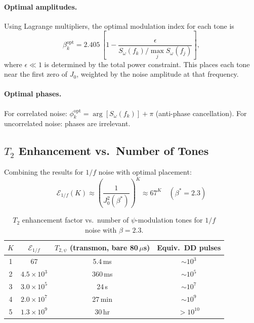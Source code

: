 \documentclass[aps,prl,twocolumn,superscriptaddress,nofootinbib,longbibliography]{revtex4-2}
\begin{document}
\paragraph{Optimal amplitudes.} Using Lagrange multipliers, the optimal
modulation index for each tone is
\begin{equation}\label{eq:beta-opt}
\beta_k^{\text{opt}} = 2.405\,
\left[1 - \frac{\epsilon}{S_\omega(f_k)/\max_j S_\omega(f_j)}\right],
\end{equation}
where $\epsilon \ll 1$ is determined by the total power constraint.
This places each tone near the first zero of $J_0$, weighted by the
noise amplitude at that frequency.

\paragraph{Optimal phases.} For correlated noise:
$\phi_k^{\text{opt}} = \arg[S_\omega(f_k)] + \pi$ (anti-phase
cancellation). For uncorrelated noise: phases are irrelevant.

\subsection{$T_2$ Enhancement vs.\ Number of Tones}

Combining the results for $1/f$ noise with optimal placement:
\begin{equation}\label{eq:E-vs-K}
\boxed{
\mathcal{E}_{1/f}(K) \approx \left(\frac{1}{J_0^2(\beta^*)}\right)^K
\approx 67^K \quad (\beta^* = 2.3)
}
\end{equation}

\begin{table}[h]
\caption{$T_2$ enhancement factor vs.\ number of $\psi$-modulation tones
for $1/f$ noise with $\beta = 2.3$.}
\label{tab:tones}
\begin{ruledtabular}
\begin{tabular}{cccc}
$K$ & $\mathcal{E}_{1/f}$ & $T_{2,\psi}$ (transmon, bare 80\,$\mu$s) &
Equiv.\ DD pulses \\
\hline
1 & 67 & 5.4\,ms & $\sim 10^3$ \\
2 & $4.5\times 10^3$ & 360\,ms & $\sim 10^5$ \\
3 & $3.0\times 10^5$ & 24\,s & $\sim 10^7$ \\
4 & $2.0\times 10^7$ & 27\,min & $\sim 10^9$ \\
5 & $1.3\times 10^9$ & 30\,hr & $>10^{10}$ \\
\end{tabular}
\end{ruledtabular}
\end{table}
\end{document}

